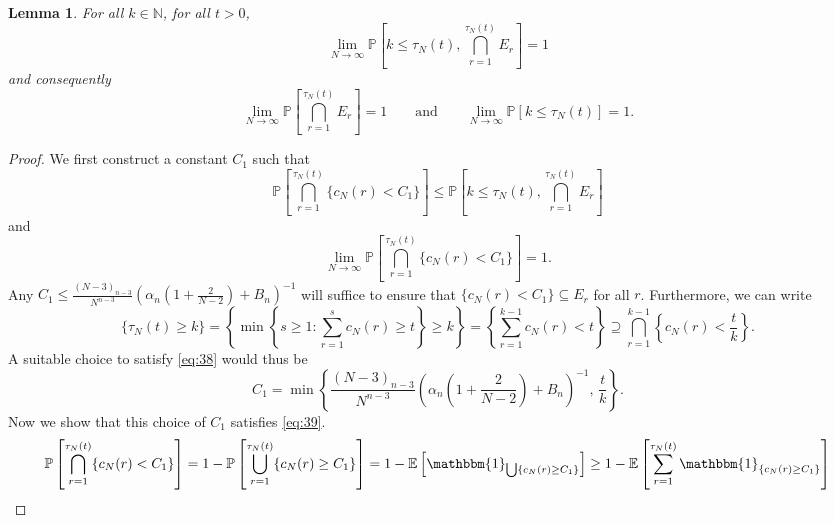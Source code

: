 \documentclass{article}
\newtheorem{lemma}{Lemma}
\newcommand{\Prob}{\mathbb{P}}
\newcommand{\E}{\mathbb{E}}
\newcommand{\1}[1]{\mathbbm{1}_{#1}}
\begin{document}
\begin{lemma}\label{thm:indicators_prob1}
For all $k \in \mathbb{N}$, for all $t>0$,
\begin{equation}\label{eq:37}
\lim_{N\to\infty} \Prob \left[k \leq \tau_N(t), \bigcap_{r=1}^{\tau_N(t)} E_r \right] = 1 
\end{equation}
and consequently
\begin{equation}\label{eq:37a}
\lim_{N\to\infty} \Prob \left[ \bigcap_{r=1}^{\tau_N(t)} E_r \right] = 1 
\qquad \text{and} \qquad
\lim_{N\to\infty} \Prob \left[ k \leq \tau_N(t) \right] = 1 .
\end{equation}
\end{lemma}

\begin{proof}
We first construct a constant $C_1$ such that 
\begin{equation}\label{eq:38}
\Prob \left[  \bigcap_{r=1}^{\tau_N(t)} \{ c_N(r) < C_1 \} \right]
\leq \Prob \left[k \leq \tau_N(t), \bigcap_{r=1}^{\tau_N(t)} E_r \right]
\end{equation}
and
\begin{equation}\label{eq:39}
\lim_{N\to\infty} \Prob \left[  \bigcap_{r=1}^{\tau_N(t)} \{ c_N(r) < C_1 \} \right] =1 .
\end{equation}
Any $C_1 \leq \frac{(N-3)_{n-3}}{N^{n-3}} \left( \alpha_n \left(1 + \frac{2}{N-2} \right) + B_n \right)^{-1}$ will suffice to ensure that $\{c_N(r) < C_1\} \subseteq E_r$ for all $r$.
Furthermore, we can write 
\begin{equation}
\{ \tau_N(t) \geq k \} 
= \left\{ \min \left\{ s \geq 1 : \sum_{r=1}^{s} c_N(r) \geq t \right\} \geq k \right\}
= \left\{ \sum_{r=1}^{k-1} c_N(r) < t \right\}
\supseteq \bigcap_{r=1}^{k-1} \left \{ c_N(r) < \frac{t}{k} \right\}.
\end{equation}
A suitable choice to satisfy \eqref{eq:38} would thus be
\begin{equation}
C_1 = \min \left\{ \frac{(N-3)_{n-3}}{N^{n-3}} \left( \alpha_n \left(1 + \frac{2}{N-2} \right) + B_n \right)^{-1} ,\, \frac{t}{k} \right\} .
\end{equation}
Now we show that this choice of $C_1$ satisfies \eqref{eq:39}.
\begin{align}
\Prob \left[  \bigcap_{r=1}^{\tau_N(t)} \{c_N(r) < C_1\} \right]
&= 1 - \Prob \left[  \bigcup_{r=1}^{\tau_N(t)} \{c_N(r) \geq C_1\} \right]
= 1 - \E \left[ \1{\bigcup \{c_N(r) \geq C_1\} } \right]
\geq 1 - \E \left[ \sum_{r=1}^{\tau_N(t)} \1{\{c_N(r) \geq C_1\}} \right] \notag\\

\end{align}
\end{proof}
\end{document}
